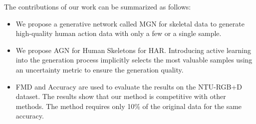 The contributions of our work can be summarized as follows:

\begin{itemize}
    \item We propose a generative network called MGN for skeletal data to generate high-quality human action data with only a few or a single sample.
    \item We propose AGN for Human Skeletons for HAR. Introducing active learning into the generation process implicitly selects the most valuable samples using an uncertainty metric to ensure the generation quality.
    \item FMD and Accuracy are used to evaluate the results on the NTU-RGB+D dataset. The results show that our method is competitive with other methods. The method requires only 10\% of the original data for the same accuracy.
\end{itemize}

